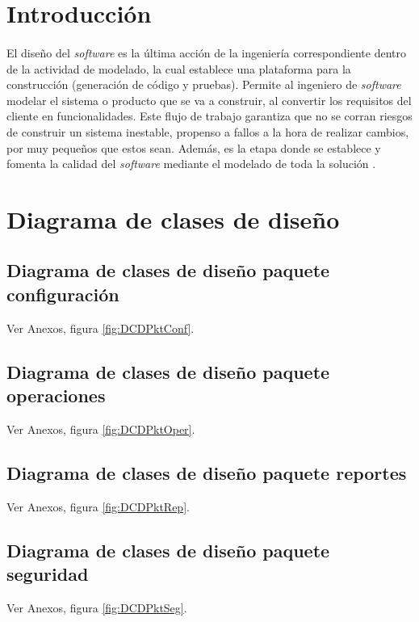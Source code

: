 
\chap{\CapCuatro}

\sf
\section{Introducción}
\paragraph{}El diseño del \textit{software} es la última acción de la ingeniería correspondiente dentro de la actividad de modelado, la cual establece una plataforma para la construcción (generación de código y pruebas). Permite al ingeniero de \textit{software} modelar el sistema o producto que se va a construir, al convertir los requisitos del cliente en funcionalidades. Este flujo de trabajo garantiza que no se corran riesgos de construir un sistema inestable, propenso a fallos a la hora de realizar cambios, por muy pequeños que estos sean. Además, es la etapa donde se establece y fomenta la calidad del \textit{software} mediante el modelado de toda la solución \cite{goran_v._rational_2007}.

\section{Diagrama de clases de diseño}
\subsection{Diagrama de clases de diseño paquete configuraci\'{o}n}
Ver Anexos, figura \ref{fig:DCDPktConf}.

\subsection{Diagrama de clases de diseño paquete operaciones}
Ver Anexos, figura \ref{fig:DCDPktOper}.

\subsection{Diagrama de clases de diseño paquete reportes}
Ver Anexos, figura \ref{fig:DCDPktRep}.

\subsection{Diagrama de clases de diseño paquete seguridad}
Ver Anexos, figura \ref{fig:DCDPktSeg}.


